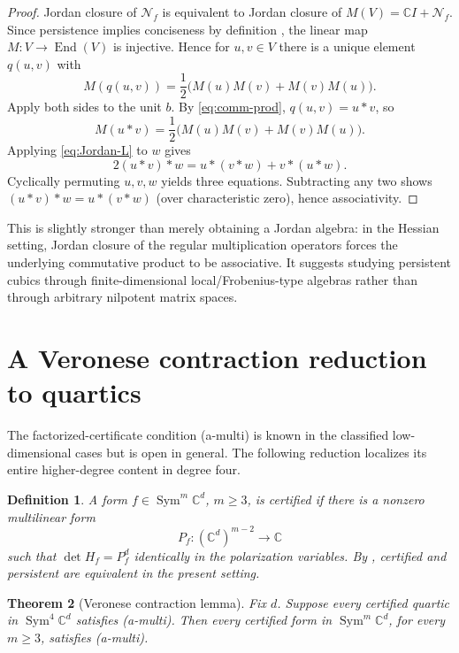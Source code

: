 \documentclass[11pt]{amsart}
\newtheorem{theorem}{Theorem}[section]
\newtheorem{definition}[theorem]{Definition}
\newcommand{\C}{\mathbb C}
\newcommand{\Sym}{\operatorname{Sym}}
\newcommand{\End}{\operatorname{End}}
\newcommand{\Nsp}{\mathcal N}
\begin{document}
\begin{proof}
Jordan closure of $\Nsp_f$ is equivalent to Jordan closure of
$M(V)=\C I+\Nsp_f$.  Since persistence implies conciseness by definition \cite[Definition~1]{GO25}, the linear map
$M:V\to\End(V)$ is injective.  Hence for $u,v\in V$ there is a unique element
$q(u,v)$ with
\[
 M(q(u,v))=\frac12\big(M(u)M(v)+M(v)M(u)\big).
\]
Apply both sides to the unit $b$.  By \eqref{eq:comm-prod},
$q(u,v)=u*v$, so
\begin{equation}\label{eq:Jordan-L}
 M(u*v)=\frac12\big(M(u)M(v)+M(v)M(u)\big).
\end{equation}
Applying \eqref{eq:Jordan-L} to $w$ gives
\[
 2(u*v)*w=u*(v*w)+v*(u*w).
\]
Cyclically permuting $u,v,w$ yields three equations.  Subtracting any two shows
$(u*v)*w=u*(v*w)$ (over characteristic zero), hence associativity.
\end{proof}

This is slightly stronger than merely obtaining a Jordan algebra: in the Hessian
setting, Jordan closure of the regular multiplication operators forces the
underlying commutative product to be associative.  It suggests studying persistent
cubics through finite-dimensional local/Frobenius-type algebras rather than through
arbitrary nilpotent matrix spaces.

\section{A Veronese contraction reduction to quartics}

The factorized-certificate condition (a-multi) is known in the classified
low-dimensional cases but is open in general.  The following reduction localizes
its entire higher-degree content in degree four.

\begin{definition}
A form $f\in\Sym^m\C^d$, $m\ge3$, is \emph{certified} if there is a nonzero
multilinear form
\[
 P_f:(\C^d)^{m-2}\to\C
\]
such that $\det H_f=P_f^d$ identically in the polarization variables.
By \cite[Theorem~2(c)]{GO25}, certified and persistent are equivalent in the
present setting.
\end{definition}

\begin{theorem}[Veronese contraction lemma]\label{thm:veronese}
Fix $d$.  Suppose every certified quartic in $\Sym^4\C^d$ satisfies
(a-multi).  Then every certified form in $\Sym^m\C^d$, for every $m\ge3$,
satisfies (a-multi).
\end{theorem}
\end{document}
